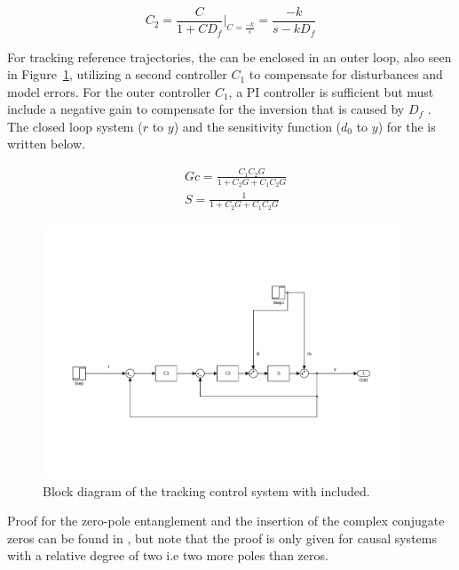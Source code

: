 \begin{equation}
  \label{eq:C2}
  C_2 = \frac{C}{1+CD_f}\Bigg|_{C = \frac{-k}{s}} = \frac{-k}{s - kD_f}
\end{equation}

For tracking reference trajectories, the \abbrIRC can be enclosed in an outer loop, also seen in Figure~\ref{fig:irc_int}, utilizing a second controller $C_1$ to compensate for disturbances and model errors. For the outer controller $C_1$, a PI controller is sufficient but must include a negative gain to compensate for the inversion that is caused by $D_f$ \citep{gu:2014}. The closed loop system ($r$ to $y$) and the sensitivity function ($d_0$ to $y$) for the \abbrIRC is written below.

\begin{subequations}
  \label{eq:discrsys}
  \begin{alignat}{2}
    & Gc = \frac{C_1C_2G}{1 + C_2G + C_1C_2G} \\
    & S = \frac{1}{1 + C_2G + C_1C_2G} \label{eq:discrsys1}
  \end{alignat}
\end{subequations}

\begin{figure}[h]
  \centering %
  \includegraphics[width=0.95\textwidth, trim=4cm 5cm 3.6cm 9.5cm, clip=true]{fig/matlab/irc_int}
  \caption{\label{fig:irc_int}Block diagram of the tracking control system with \abbrIRC included.}
\end{figure}

Proof for the zero-pole entanglement and the insertion of the complex conjugate zeros can be found in \citep{Aphale:2007}, but note that the proof is only given for causal systems with a relative degree of two i.e two more poles than zeros.

